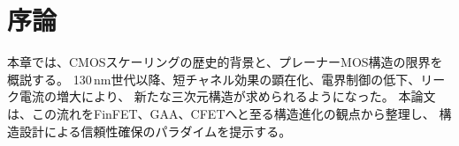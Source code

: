 \section{序論}
本章では、CMOSスケーリングの歴史的背景と、プレーナーMOS構造の限界を概説する。  
130\,nm世代以降、短チャネル効果の顕在化、電界制御の低下、リーク電流の増大により、
新たな三次元構造が求められるようになった。
本論文は、この流れをFinFET、GAA、CFETへと至る構造進化の観点から整理し、
構造設計による信頼性確保のパラダイムを提示する。

